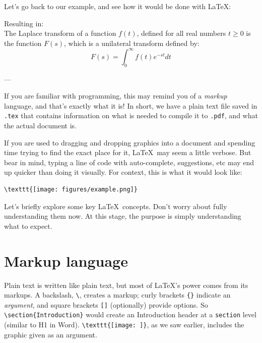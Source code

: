        Let's go back to our example, and see how it would be done with \LaTeX:
        
        Resulting in:\\
        The Laplace transform of a function $f(t)$, defined for all real numbers $t \geq 0$ is the function $F(s)$, which is a unilateral transform defined by:
        \begin{equation*}
            F(s) = \int_0^\infty f(t)e^{-st} dt
        \end{equation*}

        ---
        
        If you are familiar with programming, this may remind you of a \emph{markup} language, and that's exactly what it is!
        In short, we have a plain text file saved in \texttt{.tex} that contains information on what is needed to compile it to \texttt{.pdf}, and what the actual document is.

        If you are used to dragging and dropping graphics into a document and spending time trying to find the exact place for it, \LaTeX\ may seem a little verbose.
        But bear in mind, typing a line of code with auto-complete, suggestions, etc may end up quicker than doing it visually.
        For context, this is what it would look like:
        \begin{lstlisting}
\texttt{[image: figures/example.png]}
        \end{lstlisting}

        Let's briefly explore some key \LaTeX\ concepts.
        Don't worry about fully understanding them now.
        At this stage, the purpose is simply understanding what to expect.

\section{Markup language}
    Plain text is written like plain text, but most of LaTeX's power comes from its markups.
    A backslash, \verb|\|, creates a markup; curly brackets \verb|{}| indicate an \emph{argument}, and square brackets \verb|[]| (optionally) provide options.
    So \verb|\section{Introduction}| would create an Introduction header at a \texttt{section} level (similar to H1 in Word). 
    \verb|\texttt{[image: ]}|, as we saw earlier, includes the graphic given as an argument.


